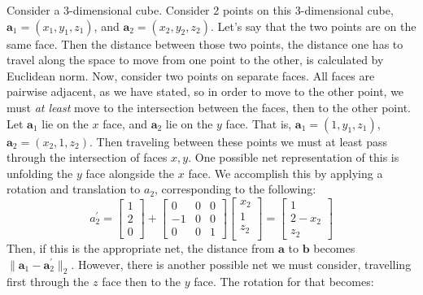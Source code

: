 Consider a 3-dimensional cube.  Consider 2 points on this 3-dimensional cube,
  $\bm{a}_1 = (x_1,y_1,z_1)$, and $\bm{a}_2 = (x_2,y_2,z_2)$. Let's say that the two points are
  on the same face.  Then the distance between those two points, the distance one has to travel
  along the space to move from one point to the other, is calculated by Euclidean norm.  Now,
  consider two points on separate faces.  All faces are pairwise adjacent, as we have stated, so
  in order to move to the other point, we must \emph{at least} move to the intersection between the
  faces, then to the other point.  Let $\bm{a}_1$ lie on the $x$ face, and $\bm{a}_2$ lie on the
  $y$ face.  That is, $\bm{a}_1 = (1, y_1, z_1)$, $\bm{a}_2 = (x_2, 1, z_2)$.  Then traveling
  between these points we must at least pass through the intersection of faces $x,y$.  One possible
  net representation of this is unfolding the $y$ face alongside the $x$ face.  We accomplish this
  by applying a rotation and translation to $a_2$, corresponding to the following:
  \begin{equation}
    \label{eq:1drotation}
    a_2^{\prime} = \begin{bmatrix}
    1 \\
    2 \\
    0
    \end{bmatrix}
    +
    \begin{bmatrix}
    0  & 0 & 0 \\
    -1 & 0 & 0 \\
    0  & 0 & 1
    \end{bmatrix}
    \begin{bmatrix}
    x_2 \\
    1 \\
    z_2 \\
    \end{bmatrix} = \begin{bmatrix}
    1 \\
    2 - x_2 \\
    z_2
    \end{bmatrix}
  \end{equation}
  Then, if this is the appropriate net, the distance from $\bm{a}$ to $\bm{b}$ becomes
  $\lVert \bm{a}_1 - \bm{a}_2^{\prime}\rVert_2$. However, there
  is another possible net we must consider, travelling first through the $z$ face then to the
  $y$ face.  The rotation for that becomes:
